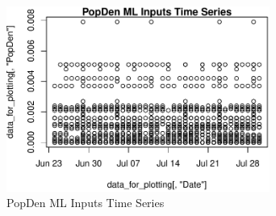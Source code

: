 \begin{figure} 
\centering  
\includegraphics[width=0.77\textwidth]{Code_Outputs/ML_input_report_AllforCaret_cleaned_StepPractice_part_practice_PopDenTS.pdf} 
\caption{\label{fig:ML_input_report_AllforCaret_cleaned_StepPractice_part_practicePopDenTS}PopDen ML Inputs Time Series} 
\end{figure} 
 
